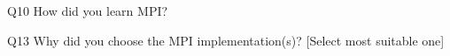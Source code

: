 \begin{description}%
\item{Q10} How did you learn MPI?%
\item{Q13} Why did you choose the MPI implementation(s)? [Select most suitable one]%
\end{description}%
